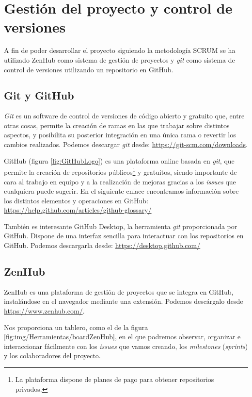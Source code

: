 \newpage
\section{Gestión del proyecto y control de versiones}
A fin de poder desarrollar el proyecto siguiendo la metodología SCRUM se ha utilizado ZenHub como sistema de gestión de proyectos y \textit{git} como sistema de control de versiones utilizando un repositorio en GitHub.

\subsection{Git y GitHub}
\textit{Git} \cite{wiki:git} es un software de control de versiones de código abierto y gratuito que, entre otras cosas, permite la creación de ramas en las que trabajar sobre distintos aspectos, y posibilita su posterior integración en una única rama o revertir los cambios realizados. Podemos descargar \textit{git} desde: \url{https://git-scm.com/downloads}.

GitHub (figura \ref{fig:GitHubLogo}) es una plataforma online basada en \textit{git}, que permite la creación de repositorios públicos\footnote{La plataforma dispone de planes de pago para obtener repositorios privados.} y gratuitos, siendo importante de cara al trabajo en equipo y a la realización de mejoras gracias a los \textit{issues} que cualquiera puede sugerir. En el siguiente enlace encontramos información sobre los distintos elementos y operaciones en GitHub: \url{https://help.github.com/articles/github-glossary/}


También es interesante GitHub Desktop, la herramienta \textit{git} proporcionada por GitHub. Dispone de una interfaz sencilla para interactuar con los repositorios en GitHub. Podemos descargarla desde: \url{https://desktop.github.com/}

\subsection{ZenHub}
ZenHub es una plataforma de gestión de proyectos que se integra en GitHub, instalándose en el navegador mediante una extensión. Podemos descárgalo desde \url{https://www.zenhub.com/}. 

Nos proporciona un tablero, como el de la figura \ref{fig:img/Herramientas/boardZenHub}, en el que podremos observar, organizar e interaccionar fácilmente con los \textit{issues} que vamos creando, los \textit{milestones} (\textit{sprints}) y los colaboradores del proyecto.

